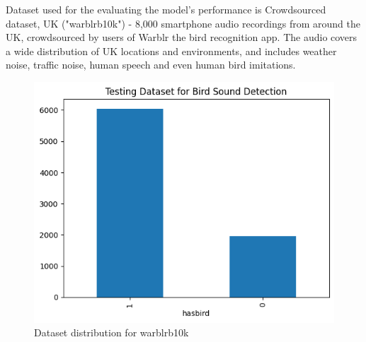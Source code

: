 Dataset used for the evaluating the model's performance is Crowdsourced
dataset, UK ("warblrb10k") - 8,000 smartphone audio recordings from around the
UK, crowdsourced by users of Warblr the bird recognition app. The audio covers
a wide distribution of UK locations and environments, and includes weather
noise, traffic noise, human speech and even human bird imitations.
\begin{figure}[h!]
    \centering
    \includegraphics[scale=0.45]{images/det_testingdataset.png}
    \caption{Dataset distribution for warblrb10k}
    \label{fig:warblrb10k dataset}
\end{figure}

